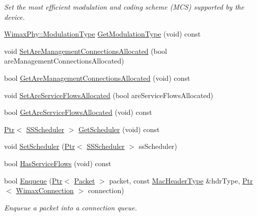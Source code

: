 \begin{DoxyCompactItemize}
\begin{DoxyCompactList}\small\item\em Set the most efficient modulation and coding scheme (M\+CS) supported by the device. \end{DoxyCompactList}\item 
\hyperlink{classns3_1_1WimaxPhy_a044c5d8a48ca992c39c2a946f6e755fa}{Wimax\+Phy\+::\+Modulation\+Type} \hyperlink{classns3_1_1SubscriberStationNetDevice_a5a14e2ccf9fcbed7d6a3cfa352c716cc}{Get\+Modulation\+Type} (void) const 
\item 
void \hyperlink{classns3_1_1SubscriberStationNetDevice_a472122a3a22c1d7f0af356f27222b022}{Set\+Are\+Management\+Connections\+Allocated} (bool are\+Management\+Connections\+Allocated)
\item 
bool \hyperlink{classns3_1_1SubscriberStationNetDevice_a74f967adb75abea6e55385bbb83350cd}{Get\+Are\+Management\+Connections\+Allocated} (void) const 
\item 
void \hyperlink{classns3_1_1SubscriberStationNetDevice_ada7d69b2b3338afaeaf0bb7a07dbbd7d}{Set\+Are\+Service\+Flows\+Allocated} (bool are\+Service\+Flows\+Allocated)
\item 
bool \hyperlink{classns3_1_1SubscriberStationNetDevice_ad47920b49a0649bbc1037b1f188dded5}{Get\+Are\+Service\+Flows\+Allocated} (void) const 
\item 
\hyperlink{classns3_1_1Ptr}{Ptr}$<$ \hyperlink{classns3_1_1SSScheduler}{S\+S\+Scheduler} $>$ \hyperlink{classns3_1_1SubscriberStationNetDevice_a5a1914c1380b84087a6ec824900dbb38}{Get\+Scheduler} (void) const 
\item 
void \hyperlink{classns3_1_1SubscriberStationNetDevice_a5735241f5c5aff33d26756b6ecf0aad2}{Set\+Scheduler} (\hyperlink{classns3_1_1Ptr}{Ptr}$<$ \hyperlink{classns3_1_1SSScheduler}{S\+S\+Scheduler} $>$ ss\+Scheduler)
\item 
bool \hyperlink{classns3_1_1SubscriberStationNetDevice_a317615d925b9ae4713dd6b4fbf81b556}{Has\+Service\+Flows} (void) const 
\item 
bool \hyperlink{classns3_1_1SubscriberStationNetDevice_a0a327d87f10438d023569350852a71e7}{Enqueue} (\hyperlink{classns3_1_1Ptr}{Ptr}$<$ \hyperlink{classns3_1_1Packet}{Packet} $>$ packet, const \hyperlink{classns3_1_1MacHeaderType}{Mac\+Header\+Type} \&hdr\+Type, \hyperlink{classns3_1_1Ptr}{Ptr}$<$ \hyperlink{classns3_1_1WimaxConnection}{Wimax\+Connection} $>$ connection)
\begin{DoxyCompactList}\small\item\em Enqueue a packet into a connection queue. \end{DoxyCompactList}\item 

\end{DoxyCompactItemize}
